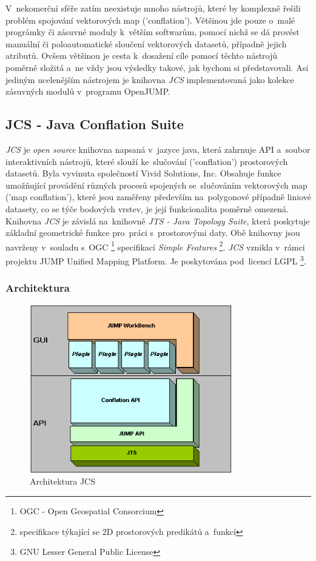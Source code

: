 V~nekomerční sféře zatím neexistuje mnoho nástrojů, které by komplexně řešili problém spojování vektorových map ('conflation'). Většinou jde pouze o~malé prográmky či
zásuvné moduly k~větším softwarům, pomocí nichž se dá provést manuální či poloautomatické sloučení vektorových datasetů, případně jejich atributů. Ovšem většinou je
cesta k~dosažení cíle pomocí těchto nástrojů poměrně složitá a~ne vždy jsou výsledky takové, jak bychom si představovali. Asi jediným ucelenějším nástrojem je knihovna
\textit{JCS} implementovaná jako kolekce zásuvných modulů v~programu OpenJUMP.

\subsection{JCS - Java Conflation Suite}
\label{JCS}

\textit{JCS} je \textit{open source} knihovna napsaná v~jazyce java, která zahrnuje API a~soubor interaktivních nástrojů, které slouží ke~slučování ('conflation') 
prostorových datasetů. Byla vyvinuta společností Vivid Solutions, Inc. Obsahuje funkce umožňující provádění různých procesů spojených se~slučováním vektorových map 
('map conflation'), které jsou zaměřeny především na~polygonové případně liniové datasety, co se týče bodových vrstev, je její funkcionalita poměrně omezená. 
Knihovna \textit{JCS} je závislá na~knihovně \textit{JTS - Java Topology Suite}, která poskytuje základní geometrické funkce pro~práci s~prostorovými
 daty. Obě knihovny jsou navrženy v~souladu s~OGC \footnote{OGC - Open Geospatial Consorcium} specifikací \textit{Simple Features} \footnote{specifikace týkající se 2D 
prostorových predikátů a~funkcí}. \textit{JCS} vznikla v~rámci projektu JUMP Unified Mapping Platform. Je poskytována pod~licencí LGPL \footnote{GNU Lesser General Public 
License}.

\subsubsection{Architektura}
\label{jcspic}
  \begin{figure}[hbt]
    \centering
      \includegraphics[width=250pt]{./pictures/JCS_Architecture.png}
      \caption{Architektura JCS}
      \label{fig:architektura}
  \end{figure}


